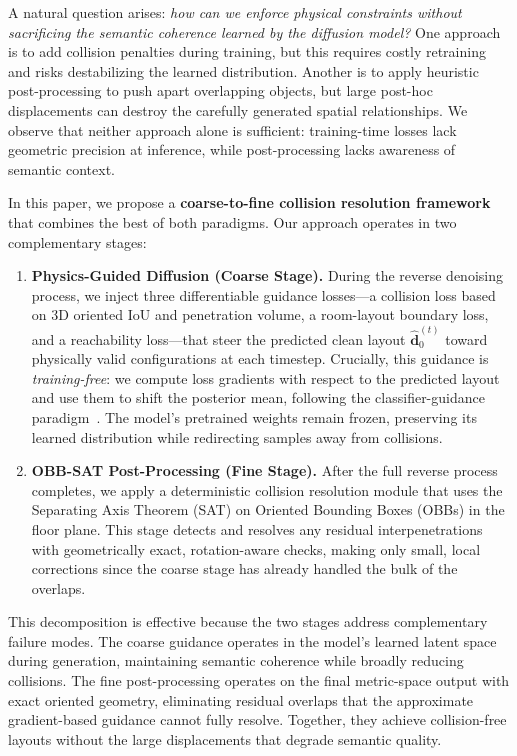 A natural question arises: \emph{how can we enforce physical constraints without sacrificing the semantic coherence learned by the diffusion model?}
One approach is to add collision penalties during training, but this requires costly retraining and risks destabilizing the learned distribution.
Another is to apply heuristic post-processing to push apart overlapping objects, but large post-hoc displacements can destroy the carefully generated spatial relationships.
We observe that neither approach alone is sufficient: training-time losses lack geometric precision at inference, while post-processing lacks awareness of semantic context.

In this paper, we propose a \textbf{coarse-to-fine collision resolution framework} that combines the best of both paradigms.
Our approach operates in two complementary stages:

\begin{enumerate}[nosep]
    \item \textbf{Physics-Guided Diffusion (Coarse Stage).}
    During the reverse denoising process, we inject three differentiable guidance losses---a collision loss based on 3D oriented IoU and penetration volume, a room-layout boundary loss, and a reachability loss---that steer the predicted clean layout $\hat{\mathbf{d}}_0^{(t)}$ toward physically valid configurations at each timestep.
    Crucially, this guidance is \emph{training-free}: we compute loss gradients with respect to the predicted layout and use them to shift the posterior mean, following the classifier-guidance paradigm~\cite{placeholder_classifier_guidance}.
    The model's pretrained weights remain frozen, preserving its learned distribution while redirecting samples away from collisions.

    \item \textbf{OBB-SAT Post-Processing (Fine Stage).}
    After the full reverse process completes, we apply a deterministic collision resolution module that uses the Separating Axis Theorem (SAT) on Oriented Bounding Boxes (OBBs) in the floor plane.
    This stage detects and resolves any residual interpenetrations with geometrically exact, rotation-aware checks, making only small, local corrections since the coarse stage has already handled the bulk of the overlaps.
\end{enumerate}

This decomposition is effective because the two stages address complementary failure modes.
The coarse guidance operates in the model's learned latent space during generation, maintaining semantic coherence while broadly reducing collisions.
The fine post-processing operates on the final metric-space output with exact oriented geometry, eliminating residual overlaps that the approximate gradient-based guidance cannot fully resolve.
Together, they achieve collision-free layouts without the large displacements that degrade semantic quality.

